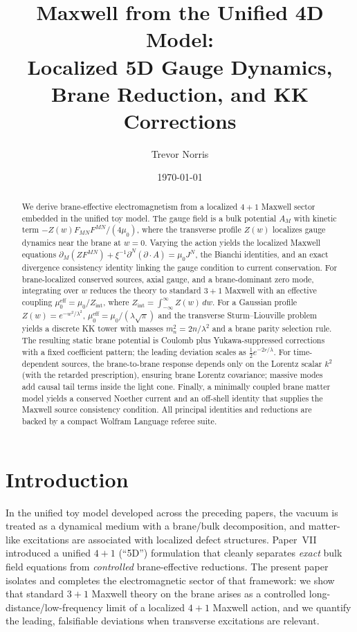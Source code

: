 \documentclass[11pt]{article}
\title{Maxwell from the Unified 4D Model:\\
Localized 5D Gauge Dynamics, Brane Reduction, and KK Corrections}
\author{Trevor Norris}
\date{\today}
\begin{document}
\maketitle

\begin{abstract}
We derive brane-effective electromagnetism from a localized \(4+1\) Maxwell sector
embedded in the unified toy model. The gauge field is a bulk potential \(A_M\)
with kinetic term \(-Z(w)F_{MN}F^{MN}/(4\mu_0)\), where the transverse profile
\(Z(w)\) localizes gauge dynamics near the brane at \(w=0\). Varying the action
yields the localized Maxwell equations
\(\partial_M(ZF^{MN})+\xi^{-1}\partial^N(\partial\!\cdot\!A)=\mu_0J^N\), the
Bianchi identities, and an exact divergence consistency identity linking the
gauge condition to current conservation. For brane-localized conserved sources,
axial gauge, and a brane-dominant zero mode, integrating over \(w\) reduces the
theory to standard \(3+1\) Maxwell with an effective coupling
\(\mu_0^{\mathrm{eff}}=\mu_0/Z_{\mathrm{int}}\), where
\(Z_{\mathrm{int}}=\int_{-\infty}^{\infty}Z(w)\,dw\). For a Gaussian profile
\(Z(w)=e^{-w^2/\lambda^2}\), \(\mu_0^{\mathrm{eff}}=\mu_0/(\lambda\sqrt{\pi})\) and
the transverse Sturm--Liouville problem yields a discrete KK tower with masses
\(m_n^2=2n/\lambda^2\) and a brane parity selection rule. The resulting static
brane potential is Coulomb plus Yukawa-suppressed corrections with a fixed
coefficient pattern; the leading deviation scales as
\(\tfrac12 e^{-2r/\lambda}\). For time-dependent sources, the brane-to-brane
response depends only on the Lorentz scalar \(k^2\) (with the retarded
prescription), ensuring brane Lorentz covariance; massive modes add causal tail
terms inside the light cone. Finally, a minimally coupled brane matter model
yields a conserved Noether current and an off-shell identity that supplies the
Maxwell source consistency condition. All principal identities and reductions are
backed by a compact Wolfram Language referee suite.
\end{abstract}

\section{Introduction}
\label{sec:intro}

In the unified toy model developed across the preceding papers, the vacuum is
treated as a dynamical medium with a brane/bulk decomposition, and matter-like
excitations are associated with localized defect structures. Paper~VII introduced
a unified \(4+1\) (``5D'') formulation that cleanly separates \emph{exact} bulk
field equations from \emph{controlled} brane-effective reductions. The present
paper isolates and completes the electromagnetic sector of that framework: we
show that standard \(3+1\) Maxwell theory on the brane arises as a controlled
long-distance/low-frequency limit of a localized \(4+1\) Maxwell action, and we
quantify the leading, falsifiable deviations when transverse excitations are
relevant.
\end{document}
